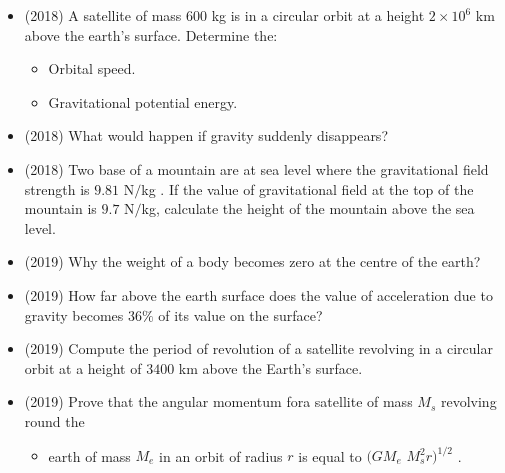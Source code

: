 \documentclass{article}
\begin{document}
\begin{itemize}
\begin{itemize}
\end{itemize}
\item (2018)  A satellite of mass $ 600$ kg is in a circular orbit at a height $ 2 \times 10^{6}$ km above the earth’s surface. Determine the:
 \begin{itemize}
\item Orbital speed. 
\item Gravitational potential energy. 
\end{itemize}
\item (2018)  What would happen if gravity suddenly disappears?  
\item (2018)  Two base of a mountain are at sea level where the gravitational field strength is $ 9.81$ N$/$kg . If the value of gravitational field at the top of the mountain is $ 9.7$ N$/$kg, calculate the height of the mountain above the sea level. 
\item (2019)  Why the weight of a body becomes zero at the centre of the earth? 
\item (2019)  How far above the earth surface does the value of acceleration due to gravity becomes $ 36\%$ of its value on the surface? 
\item (2019)  Compute the period of revolution of a satellite revolving in a circular orbit at a height of $ 3400$ km above the Earth’s surface. 
\item (2019)  Prove that the angular momentum fora satellite of mass $ M_{s}$ revolving round the
 \begin{itemize}
\item earth of mass $ M_{e}$ in an orbit of radius $ r$ is equal to $ (G M_{e}$  $ M_{s}^{2}r)^{1/2}$ .
\end{itemize}
\end{itemize}
\end{document}
